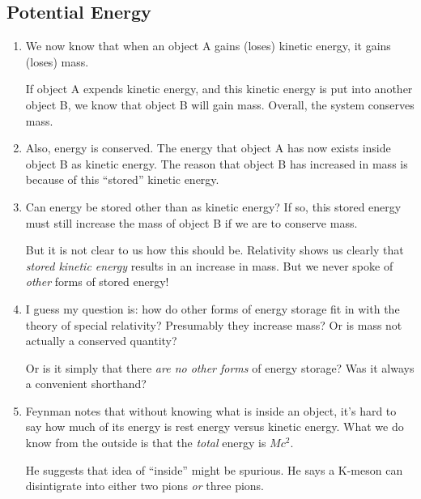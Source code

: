 \subsection{Potential Energy}

\begin{enumerate}

  \item We now know that when an object A gains (loses) kinetic energy,
  it gains (loses) mass.

  If object A expends kinetic energy, and this kinetic energy is put
  into another object B, we know that object B will gain mass. Overall,
  the system conserves mass.

  \item Also, energy is conserved. The energy that object A has now
  exists inside object B as kinetic energy. The reason that object B has
  increased in mass is because of this ``stored'' kinetic energy.

  \item Can energy be stored other than as kinetic energy? If so, this
  stored energy must still increase the mass of object B if we are to
  conserve mass.

  But it is not clear to us how this should be. Relativity shows us
  clearly that \emph{stored kinetic energy} results in an increase in
  mass. But we never spoke of \emph{other} forms of stored energy!

  \item I guess my question is: how do other forms of energy storage fit
  in with the theory of special relativity? Presumably they increase
  mass? Or is mass not actually a conserved quantity?

  Or is it simply that there \emph{are no other forms} of energy
  storage? Was it always a convenient shorthand? 

  \item Feynman notes that without knowing what is inside an object,
  it's hard to say how much of its energy is rest energy versus kinetic
  energy. What we do know from the outside is that the \emph{total}
  energy is $Mc^2$.

  He suggests that idea of ``inside'' might be spurious. He says a
  K-meson can disintigrate into either two pions \emph{or} three pions.

\end{enumerate}

